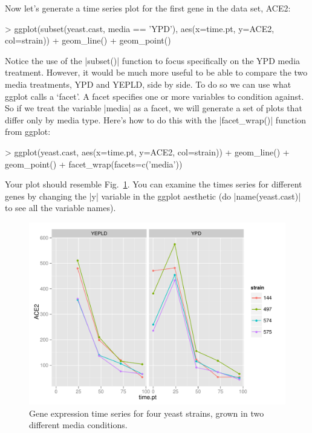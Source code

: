 Now let's generate a time series plot for the first gene in the data set, ACE2:
\begin{R}
> ggplot(subset(yeast.cast, media == 'YPD'), 
        aes(x=time.pt, y=ACE2, col=strain)) + geom_line() + geom_point()
\end{R}
%
Notice the use of the |subset()| function to focus specifically on the YPD media treatment.  However, it would be much more useful to be able to compare the two media treatments, YPD and YEPLD, side by side.  To do so we can use what ggplot calls a `facet'.  A facet  specifies one or more variables to condition against.  So if we treat the variable |media| as a facet, we will generate a set of plots that differ only by media type.  Here's how to do this  with the |facet_wrap()| function from ggplot:
\begin{R}
> ggplot(yeast.cast, aes(x=time.pt, y=ACE2, col=strain)) + geom_line() + geom_point() + facet_wrap(facets=c('media'))
\end{R}
%
Your plot should resemble Fig.~\ref{fig:yeasttime}.  You can examine the times series for different genes by changing the |y| variable in the ggplot aesthetic (do |name(yeast.cast)| to see all the variable names).
%
\begin{figure}[htbp]
\centering
\includegraphics[width=0.7\columnwidth]{./figures/hands-on3/yeast-timeseries-plot.pdf}
\caption{Gene expression time series for four yeast strains, grown in two different media conditions.\label{fig:yeasttime}}
\end{figure}




